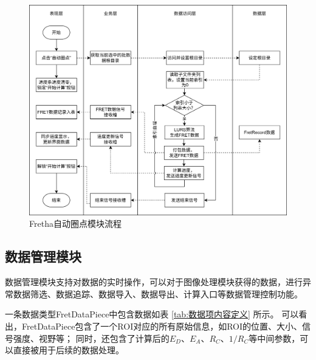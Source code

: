 \begin{figure}[htbp]
    \centering
    \includegraphics[width=1\linewidth]{../figures/2/2_自动ROI圈点模块业务流程.png}
    \caption{Fretha自动圈点模块流程}
    \label{fig:fret_auto_roi_flow}
\end{figure}

\subsection{数据管理模块}
\label{sec:数据管理模块}

数据管理模块支持对数据的实时操作，可以对于图像处理模块获得的数据，进行异常数据筛选、数据追踪、数据导入、数据导出、计算入口等数据管理控制功能。

一条数据类型FretDataPiece中包含数据如表 \ref{tab:数据项内容定义} 所示。
可以看出，FretDataPiece包含了一个ROI对应的所有原始信息，如ROI的位置、大小、信号强度、视野等；
同时，还包含了计算后的$E_D$、$E_A$、$R_C$、$1/R_C$等中间参数，可以直接被用于后续的数据处理。

